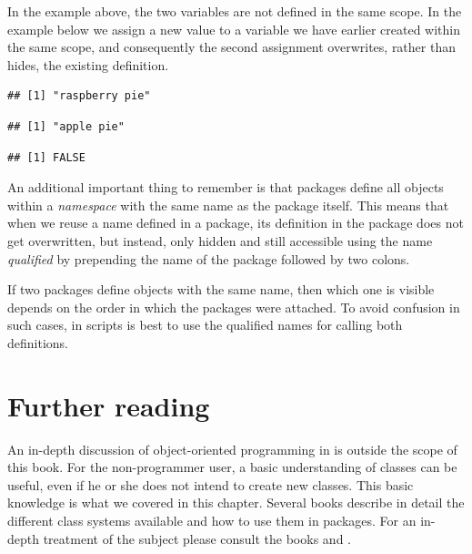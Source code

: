\documentclass[krantz2]{krantz}\usepackage{knitr}
\begin{document}
In the example above, the two variables are not defined in the same scope. In the example below we assign a new value to a variable we have earlier created within the same scope, and consequently the second assignment overwrites, rather than hides, the existing definition.

\begin{knitrout}\footnotesize
{}\color{fgcolor}\begin{kframe}
\begin{alltt}
 \hlkwb{<-} 
\end{alltt}
\begin{verbatim}
## [1] "raspberry pie"
\end{verbatim}
\begin{alltt}
 \hlkwb{<-} 
\end{alltt}
\begin{verbatim}
## [1] "apple pie"
\end{verbatim}
\begin{alltt}
\hlstd{(}\hlstd{)}
\end{alltt}
\begin{verbatim}
## [1] FALSE
\end{verbatim}
\end{kframe}
\end{knitrout}

An additional important thing to remember is that \Rlang packages define all objects within a \emph{namespace} with the same name as the package itself. This means that when we reuse a name defined in a package, its definition in the package does not get overwritten, but instead, only hidden and still accessible using the name \emph{qualified} by prepending the name of the package followed by two colons.

If two packages define objects with the same name, then which one is visible depends on the order in which the packages were attached. To avoid confusion in such cases, in scripts is best to use the qualified names for calling both definitions.

\section{Further reading}

An in-depth discussion of object-oriented programming in \Rlang is outside the scope of this book. For the non-programmer user, a basic understanding of \Rlang classes can be useful, even if he or she does not intend to create new classes. This basic knowledge is what we covered in this chapter. Several books describe in detail the different class systems available and how to use them in \Rlang packages. For an in-depth treatment of the subject please consult the books  \autocite{Wickham2019} and  \autocite{Chambers2016}.
\end{document}
